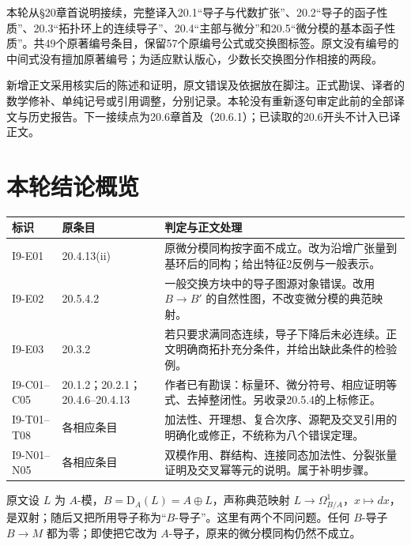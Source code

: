 本轮从§20章首说明接续，完整译入20.1“导子与代数扩张”、20.2“导子的函子性质”、20.3“拓扑环上的连续导子”、20.4“主部与微分”和20.5“微分模的基本函子性质”。共49个原著编号条目，保留57个原编号公式或交换图标签。原文没有编号的中间式没有擅加原著编号；为适应默认版心，少数长交换图分作相接的两段。

新增正文采用核实后的陈述和证明，原文错误及依据放在脚注。正式勘误、译者的数学修补、单纯记号或引用调整，分别记录。本轮没有重新逐句审定此前的全部译文与历史报告。下一接续点为20.6章首及（20.6.1）；已读取的20.6开头不计入已译正文。

\section*{本轮结论概览}
\begin{longtable}{@{}p{.17\linewidth}p{.19\linewidth}p{.55\linewidth}@{}}
\toprule 标识 & 原条目 & 判定与正文处理\\\midrule\endhead
I9-E01 & 20.4.13(ii) & 原微分模同构按字面不成立。改为沿增广张量到基环后的同构；给出特征2反例与一般表示。\\
I9-E02 & 20.5.4.2 & 一般交换方块中的导子图源对象错误。改用 $B\to B'$ 的自然性图，不改变微分模的典范映射。\\
I9-E03 & 20.3.2 & 若只要求满同态连续，导子下降后未必连续。正文明确商拓扑充分条件，并给出缺此条件的检验例。\\
I9-C01--C05 & 20.1.2；20.2.1；20.4.6--20.4.13 & 作者已有勘误：标量环、微分符号、相应证明等式、去掉整闭性。另收录20.5.4的上标修正。\\
I9-T01--T08 & 各相应条目 & 加法性、开理想、复合次序、源靶及交叉引用的明确化或修正，不统称为八个错误定理。\\
I9-N01--N05 & 各相应条目 & 双模作用、群结构、连接同态加法性、分裂张量证明及交叉幂等元的说明。属于补明步骤。\\
\bottomrule
\end{longtable}

原文设 $L$ 为 $A$-模，$B=\mathrm D_A(L)=A\oplus L$，声称典范映射 $L\to\Omega^1_{B/A}$，$x\mapsto dx$，是双射；随后又把所用导子称为“$B$-导子”。这里有两个不同问题。任何 $B$-导子 $B\to M$ 都为零；即使把它改为 $A$-导子，原来的微分模同构仍然不成立。

